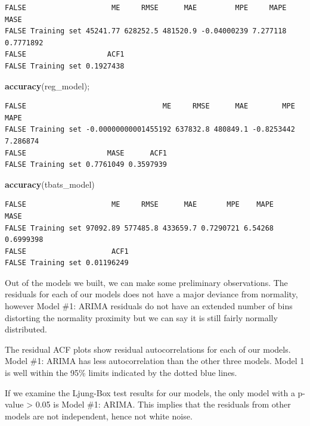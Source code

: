 \documentclass[openany]{book}
\newenvironment{Shaded}{\begin{snugshade}}{\end{snugshade}}
\newcommand{\KeywordTok}[1]{\textcolor[rgb]{0.13,0.29,0.53}{\textbf{#1}}}
\newcommand{\NormalTok}[1]{#1}
\begin{document}
\begin{verbatim}
FALSE                    ME     RMSE      MAE         MPE     MAPE      MASE
FALSE Training set 45241.77 628252.5 481520.9 -0.04000239 7.277118 0.7771892
FALSE                   ACF1
FALSE Training set 0.1927438
\end{verbatim}

\begin{Shaded}
\begin{Highlighting}[]
\KeywordTok{accuracy}\NormalTok{(reg_model);}
\end{Highlighting}
\end{Shaded}

\begin{verbatim}
FALSE                                ME     RMSE      MAE        MPE     MAPE
FALSE Training set -0.00000000001455192 637832.8 480849.1 -0.8253442 7.286874
FALSE                   MASE      ACF1
FALSE Training set 0.7761049 0.3597939
\end{verbatim}

\begin{Shaded}
\begin{Highlighting}[]
\KeywordTok{accuracy}\NormalTok{(tbats_model)}
\end{Highlighting}
\end{Shaded}

\begin{verbatim}
FALSE                    ME     RMSE      MAE       MPE    MAPE      MASE
FALSE Training set 97092.89 577485.8 433659.7 0.7290721 6.54268 0.6999398
FALSE                    ACF1
FALSE Training set 0.01196249
\end{verbatim}

Out of the models we built, we can make some preliminary observations.
The residuals for each of our models does not have a major deviance from
normality, however Model \#1: ARIMA residuals do not have an extended
number of bins distorting the normality proximity but we can say it is
still fairly normally distributed.

The residual ACF plots show residual autocorrelations for each of our
models. Model \#1: ARIMA has less autocorrelation than the other three
models. Model 1 is well within the 95\% limits indicated by the dotted
blue lines.

If we examine the Ljung-Box test results for our models, the only model
with a p-value \textgreater{} 0.05 is Model \#1: ARIMA. This implies
that the residuals from other models are not independent, hence not
white noise.
\end{document}
